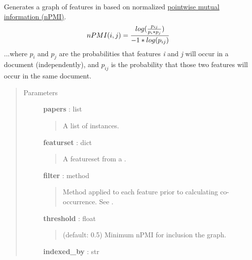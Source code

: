\documentclass[letterpaper,10pt,english]{sphinxmanual}
\begin{document}
\begin{fulllineitems}
\label{tethne.networks.features:tethne.networks.features.mutual_information}
Generates a graph of features in  based on normalized 
\href{http://en.wikipedia.org/wiki/Pointwise\_mutual\_information}{pointwise mutual information (nPMI)}.
\begin{gather}
\begin{split}nPMI(i,j)=\frac{log(\frac{p_{ij}}{p_i*p_j})}{-1*log(p_{ij})}\end{split}\notag
\end{gather}
...where \(p_i\) and \(p_j\) are the probabilities that features
\emph{i} and \emph{j} will occur in a document (independently), and \(p_{ij}\) is
the probability that those two features will occur in the same document.
\begin{quote}\begin{description}
\item[{Parameters}] \leavevmode
\textbf{papers} : list
\begin{quote}

A list of {\hyperref[tethne.classes.paper:tethne.classes.paper.Paper]{}} instances.
\end{quote}

\textbf{featurset} : dict
\begin{quote}

A featureset from a {\hyperref[tethne.classes.corpus:tethne.classes.corpus.Corpus]{}}.
\end{quote}

\textbf{filter} : method
\begin{quote}

Method applied to each feature prior to calculating co-occurrence.
See {\hyperref[tethne.networks.features:tethne.networks.features.cooccurrence]{}}.
\end{quote}

\textbf{threshold} : float
\begin{quote}

(default: 0.5) Minimum nPMI for inclusion the graph.
\end{quote}

\textbf{indexed\_by} : str
\begin{quote}


\end{quote}
\end{description}
\end{quote}
\end{fulllineitems}
\end{document}
